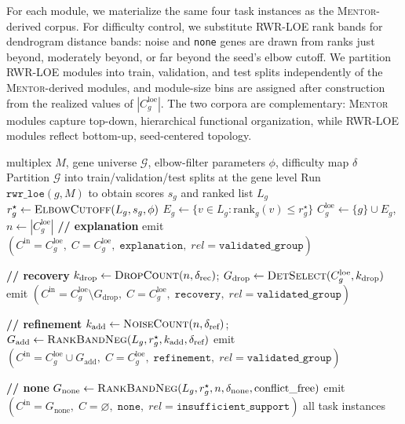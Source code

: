 \documentclass[thesis,letterpaper,12pt]{utthesis}
\begin{document}
For each module, we materialize the same four task instances as the \textsc{Mentor}-derived corpus. For difficulty control, we substitute RWR-LOE rank bands for dendrogram distance bands: noise and \texttt{none} genes are drawn from ranks just beyond, moderately beyond, or far beyond the seed's elbow cutoff. We partition RWR-LOE modules into train, validation, and test splits independently of the \textsc{Mentor}-derived modules, and module-size bins are assigned after construction from the realized values of $|C^{\text{loe}}_g|$. The two corpora are complementary: \textsc{Mentor} modules capture top-down, hierarchical functional organization, while RWR-LOE modules reflect bottom-up, seed-centered topology.
\begin{algorithm}[t]
\caption{Creation of the RWR-LOE module training corpus}
\label{alg:loe-module-corpus}
\begin{algorithmic}[1]
\Require multiplex $M$, gene universe $\mathcal{G}$, elbow-filter parameters $\phi$, difficulty map $\delta$
\State Partition $\mathcal{G}$ into train/validation/test splits at the gene level
    \State Run $\texttt{rwr\_loe}(g, M)$ to obtain scores $s_g$ and ranked list $L_g$
    \State $r^\star_g \gets \textsc{ElbowCutoff}(L_g, s_g, \phi)$
    \State $E_g \gets \{v \in L_g : \mathrm{rank}_g(v) \le r^\star_g\}$
    \State $C^{\text{loe}}_g \gets \{g\} \cup E_g$,
           \quad $n \gets |C^{\text{loe}}_g|$
    \State \textbf{// explanation}
    \State emit $(C^{\text{in}} = C^{\text{loe}}_g,\; C = C^{\text{loe}}_g,\;
           \texttt{explanation},\; rel=\texttt{validated\_group})$

    \State \textbf{// recovery}
    \State $k_{\text{drop}} \gets \textsc{DropCount}(n, \delta_{\text{rec}})$;
           \quad $G_{\text{drop}} \gets \textsc{DetSelect}(C^{\text{loe}}_g,
           k_{\text{drop}})$
    \State emit $(C^{\text{in}} = C^{\text{loe}}_g \setminus G_{\text{drop}},\;
           C = C^{\text{loe}}_g,\; \texttt{recovery},\;
           rel=\texttt{validated\_group})$

    \State \textbf{// refinement}
    \State $k_{\text{add}} \gets \textsc{NoiseCount}(n, \delta_{\text{ref}})$;
           \quad $G_{\text{add}} \gets \textsc{RankBandNeg}(L_g, r^\star_g, k_{\text{add}},
           \delta_{\text{ref}})$
    \State emit $(C^{\text{in}} = C^{\text{loe}}_g \cup G_{\text{add}},\;
           C = C^{\text{loe}}_g,\; \texttt{refinement},\;
           rel=\texttt{validated\_group})$

    \State \textbf{// none}
    \State $G_{\text{none}} \gets \textsc{RankBandNeg}(L_g, r^\star_g, n, \delta_{\text{none}},
           \text{conflict\_free})$
    \State emit $(C^{\text{in}} = G_{\text{none}},\; C = \varnothing,\;
           \texttt{none},\; rel=\texttt{insufficient\_support})$
\EndFor
\State \Return all task instances
\end{algorithmic}
\end{algorithm}
\end{document}
